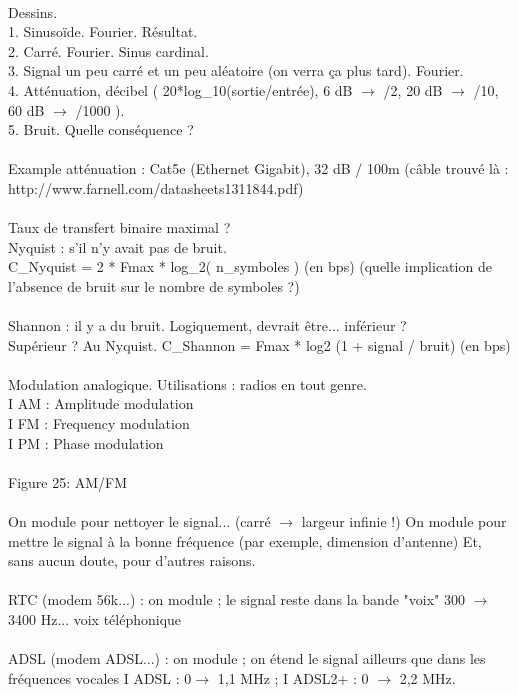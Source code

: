 \documentclass[5pt]{article}
\begin{document}
\begin{scriptsize}
\\
Dessins.\\
1. Sinusoïde. Fourier. Résultat.\\
2. Carré. Fourier. Sinus cardinal.\\
3. Signal un peu carré et un peu aléatoire (on verra ça plus tard). Fourier.\\
4. Atténuation, décibel ( 20*log\_10(sortie/entrée), 6 dB $\rightarrow$ /2, 20 dB $\rightarrow$ /10, 60 dB $\rightarrow$ /1000 ).\\
5. Bruit. Quelle conséquence ?\\
\\
Example atténuation : Cat5e (Ethernet Gigabit), 32 dB / 100m (câble trouvé là : http://www.farnell.com/datasheets1311844.pdf)\\
\\
Taux de transfert binaire maximal ?\\
Nyquist : s’il n’y avait pas de bruit.\\
C\_Nyquist = 2 * Fmax * log\_2( n\_symboles ) (en bps) (quelle implication de l’absence de bruit sur le nombre de symboles ?)\\
\\
Shannon : il y a du bruit. Logiquement, devrait être... inférieur ?\\
Supérieur ? Au Nyquist. C\_Shannon = Fmax * log2 (1 + signal / bruit) (en bps)\\
\\
Modulation analogique. Utilisations : radios en tout genre.\\
I AM : Amplitude modulation\\
I FM : Frequency modulation\\
I PM : Phase modulation\\
\\
Figure 25: AM/FM\\
\\
On module pour nettoyer le signal... (carré $\rightarrow$ largeur infinie !) On module pour mettre le signal à la bonne fréquence (par exemple, dimension d’antenne) Et, sans aucun doute, pour d’autres raisons.\\
\\
RTC (modem 56k...) : on module ; le signal reste dans la bande "voix" 300 $\rightarrow$ 3400 Hz... voix téléphonique\\
\\
ADSL (modem ADSL...) : on module ; on étend le signal ailleurs que dans les fréquences vocales I ADSL : 0$ \rightarrow$ 1,1 MHz ; I ADSL2+ : 0 $\rightarrow$ 2,2 MHz.\\

\end{scriptsize}
\end{document}
